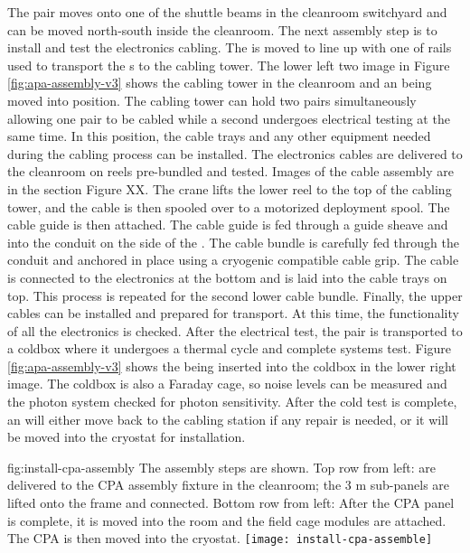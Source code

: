 The  pair moves onto one of the shuttle beams in the cleanroom switchyard and can be moved north-south inside the cleanroom. The next assembly step is to install and test the electronics cabling. The  is moved to line up with one of rails used to transport the s to the  cabling tower. The lower left two image in Figure \ref{fig:apa-assembly-v3} shows the  cabling tower in the cleanroom and an  being moved into position. The  cabling tower can hold two  pairs simultaneously allowing one  pair to be cabled while a second  undergoes electrical testing at the same time. In this position, the cable trays and any other equipment needed during the cabling process can be installed. The electronics cables are delivered to the cleanroom on reels pre-bundled and tested. Images of the cable assembly are in the  section Figure XX.
The crane lifts the lower  reel  to the top of the  cabling tower, and the cable is then spooled over to a motorized deployment spool. The cable guide is then attached.  The cable guide is fed through a guide sheave and into the conduit on the side of the . The cable bundle is carefully fed through the conduit and anchored in place using a cryogenic compatible cable grip. The cable is connected to the electronics at the bottom and is laid into the cable trays on top. This process is repeated for the second lower  cable bundle. Finally, the upper cables can be installed and prepared for transport. At this time, the functionality of all the electronics is checked. After the  electrical test, the  pair is transported to a coldbox where it undergoes a thermal cycle and complete systems test. Figure \ref{fig:apa-assembly-v3} shows the  being inserted into the coldbox in the lower right image. The coldbox is also a Faraday cage, so noise levels can be measured and the photon system checked for photon sensitivity. After the cold test is complete, an  will either move back to the cabling station if any repair is needed, or it will be moved into the cryostat for installation. 



\begin{dunefigure}{fig:install-cpa-assembly}
  {The  assembly steps are shown. Top row from left:   are delivered to the CPA assembly fixture in the cleanroom; the 3 \si{m} sub-panels are lifted onto the frame and connected. Bottom row from left: After the CPA panel is complete, it is moved into the room and the field cage modules are attached. The CPA is then moved into the cryostat.}
\texttt{[image: install-cpa-assemble]}
\end{dunefigure}

